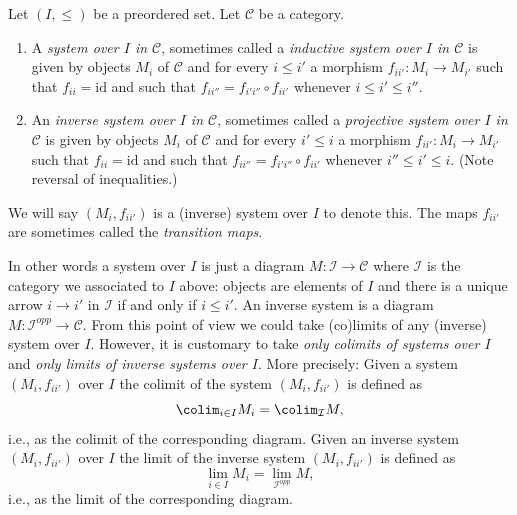 \begin{definition}
\label{definition-system-over-poset}
Let $(I, \leq)$ be a preordered set. Let $\mathcal{C}$ be a category.
\begin{enumerate}
\item A {\it system over $I$ in $\mathcal{C}$}, sometimes called a
{\it inductive system over $I$ in $\mathcal{C}$} is given by
objects $M_i$ of $\mathcal{C}$ and for every $i \leq i'$ a
morphism $f_{ii'} : M_i \to M_{i'}$ such that $f_{ii}
= \text{id}$ and such that $f_{ii''} = f_{i'i''} \circ f_{i i'}$
whenever $i \leq i' \leq i''$.
\item An {\it inverse system over $I$ in $\mathcal{C}$},
sometimes called a {\it projective system over $I$ in $\mathcal{C}$}
is given by objects $M_i$ of $\mathcal{C}$ and for every $i' \leq i$ a
morphism $f_{ii'} : M_i \to M_{i'}$ such that $f_{ii}
= \text{id}$ and such that $f_{ii''} = f_{i'i''} \circ f_{i i'}$
whenever $i'' \leq i' \leq i$. (Note reversal of inequalities.)
\end{enumerate}
We will say $(M_i, f_{ii'})$ is a (inverse) system over $I$ to
denote this. The maps $f_{ii'}$ are sometimes
called the {\it transition maps}.
\end{definition}

\noindent
In other words a system over $I$ is just a diagram
$M : \mathcal{I} \to \mathcal{C}$ where $\mathcal{I}$ is the category
we associated to $I$ above: objects are elements of $I$ and
there is a unique arrow $i \to i'$ in $\mathcal{I}$ if and only if $i \leq i'$.
An inverse system is a diagram $M : \mathcal{I}^{opp} \to \mathcal{C}$.
From this point of view we could take (co)limits of any (inverse)
system over $I$. However, it is customary to take
{\it only colimits of systems over $I$} and
{\it only limits of inverse systems over $I$}.
More precisely: Given a system $(M_i, f_{ii'})$
over $I$ the colimit of the system
$(M_i, f_{ii'})$ is defined as
$$
\colim_{i \in I} M_i = \colim_\mathcal{I} M,
$$
i.e., as the colimit of the corresponding diagram.
Given an inverse system $(M_i, f_{ii'})$ over $I$ the limit
of the inverse system $(M_i, f_{ii'})$ is defined as
$$
\lim_{i \in I} M_i = \lim_{\mathcal{I}^{opp}} M,
$$
i.e., as the limit of the corresponding diagram.

